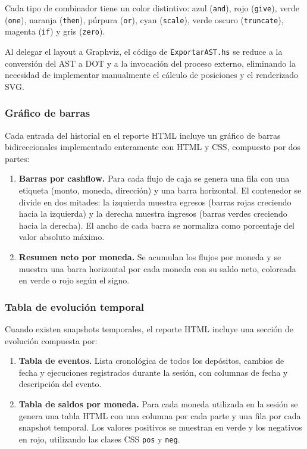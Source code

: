 \documentclass[a4paper, 12pt]{article}
\begin{document}
Cada tipo de combinador tiene un color distintivo: azul (\texttt{and}), rojo (\texttt{give}), verde (\texttt{one}), naranja (\texttt{then}), púrpura (\texttt{or}), cyan (\texttt{scale}), verde oscuro (\texttt{truncate}), magenta (\texttt{if}) y gris (\texttt{zero}).

Al delegar el layout a Graphviz, el código de \texttt{ExportarAST.hs} se reduce a la conversión del AST a DOT y a la invocación del proceso externo, eliminando la necesidad de implementar manualmente el cálculo de posiciones y el renderizado SVG.

\subsubsection{Gráfico de barras}

Cada entrada del historial en el reporte HTML incluye un gráfico de barras bidireccionales implementado enteramente con HTML y CSS, compuesto por dos partes:

\begin{enumerate}[nosep]
    \item \textbf{Barras por cashflow.} Para cada flujo de caja se genera una fila con una etiqueta (monto, moneda, dirección) y una barra horizontal. El contenedor se divide en dos mitades: la izquierda muestra egresos (barras rojas creciendo hacia la izquierda) y la derecha muestra ingresos (barras verdes creciendo hacia la derecha). El ancho de cada barra se normaliza como porcentaje del valor absoluto máximo.
    \item \textbf{Resumen neto por moneda.} Se acumulan los flujos por moneda y se muestra una barra horizontal por cada moneda con su saldo neto, coloreada en verde o rojo según el signo.
\end{enumerate}

\subsubsection{Tabla de evolución temporal}

Cuando existen snapshots temporales, el reporte HTML incluye una sección de evolución compuesta por:

\begin{enumerate}[nosep]
    \item \textbf{Tabla de eventos.} Lista cronológica de todos los depósitos, cambios de fecha y ejecuciones registrados durante la sesión, con columnas de fecha y descripción del evento.
    \item \textbf{Tabla de saldos por moneda.} Para cada moneda utilizada en la sesión se genera una tabla HTML con una columna por cada parte y una fila por cada snapshot temporal. Los valores positivos se muestran en verde y los negativos en rojo, utilizando las clases CSS \texttt{pos} y \texttt{neg}.
\end{enumerate}
\end{document}

